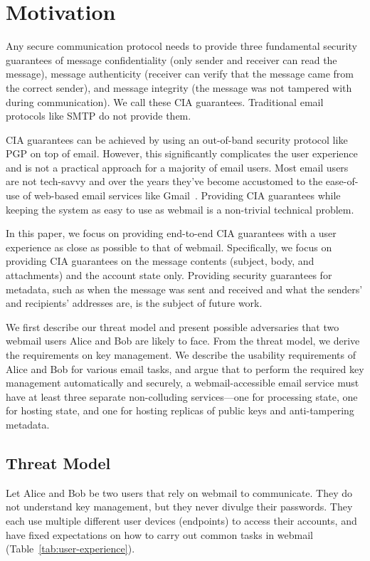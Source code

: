 \section{Motivation}
\label{sec:motivation}

Any secure communication protocol needs to provide three 
fundamental security guarantees of message confidentiality 
(only sender and receiver can read the message), message 
authenticity (receiver can verify that the message came 
from the correct sender), and message integrity (the message 
was not tampered with during communication). We call these 
CIA guarantees. Traditional email protocols like SMTP do not
provide them.

CIA guarantees can be achieved by using an out-of-band security 
protocol like PGP on top of email. However, this significantly 
complicates the user experience and is not a practical approach 
for a majority of email users. Most email users are not tech-savvy 
and over the years they've become accustomed to the ease-of-use of 
web-based email services like Gmail~\cite{GMail}. Providing CIA 
guarantees while keeping the system as easy to use as webmail is 
a non-trivial technical problem. 

In this paper, we focus on providing end-to-end CIA guarantees 
with a user experience as close as possible to that of webmail. 
Specifically, we focus on providing CIA guarantees on the message 
contents (subject, body, and attachments) and the account state only. 
Providing security guarantees for metadata, such as when the message 
was sent and received and what the senders' and recipients' addresses 
are, is the subject of future work.

We first describe our threat model and present possible adversaries 
that two webmail users Alice and Bob are likely to face. From the 
threat model, we derive the requirements on key management. We describe 
the usability requirements of Alice and Bob for various email tasks,
and argue that to perform the required 
key management automatically and securely, a webmail-accessible email service must 
have at least three separate non-colluding services---one for processing 
state, one for hosting state, and one for hosting replicas of public keys and anti-tampering metadata. 

\subsection{Threat Model}
Let Alice and Bob be two users that rely on webmail to communicate.  They do not understand key management, but they never divulge their passwords. They each use multiple different user devices (endpoints) to access their accounts, and have fixed expectations on how to carry out common tasks in webmail (Table~\ref{tab:user-experience}).

